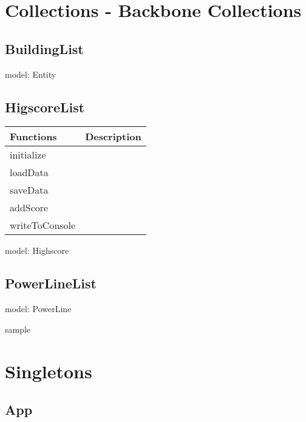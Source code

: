 \clearpage

\section{Collections - Backbone Collections}
	
\subsection*{BuildingList}

	model: Entity

\subsection*{HigscoreList}

	\begin{table}[H]
	\begin{tabular}{p{4cm} | p{8cm} }
	\hline
	\rowcolor{gray}
	Functions & Description \\ \hline
	initialize & \\ \hline
	loadData & \\ \hline
	saveData & \\ \hline
	addScore & \\ \hline
	writeToConsole & \\ \hline

	\end{tabular}
	\end{table}

	
	model: Highscore

	

\subsection*{PowerLineList}

	model: PowerLine

	sample

\clearpage

\section{Singletons}

\subsection*{App}

